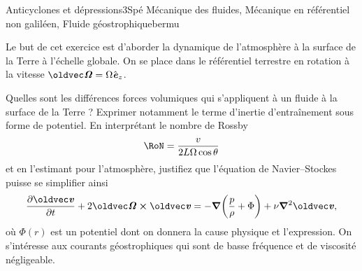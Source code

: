 
\begin{exercise}{Anticyclones et dépressions}{3}{Spé}
{Mécanique des fluides, Mécanique en référentiel non galiléen, Fluide géostrophique}{bermu}

Le but de cet exercice est d'aborder la dynamique de l'atmosphère à la surface de la Terre à l'échelle globale. On se place dans le référentiel terrestre en rotation à la vitesse $\vOm = \Omega\ve_z$.


\begin{questions}
    \questioncours Quelles sont les différences forces volumiques qui s'appliquent à un fluide à la surface de la Terre ? Exprimer notamment le terme d'inertie d'entraînement sous forme de potentiel.
    \question\label{que:rossby} En interprétant le nombre de Rossby 
    $$\RoN = \dfrac{v}{2L\Omega\cos\theta}$$
    et en l'estimant pour l'atmosphère, justifiez que l'équation de Navier--Stockes puisse se simplifier ainsi
    $$\pdv{\vv}{t} + 2\vOm\cross\vv = -\grad\qty(\dfrac{p}{\rho} + \Phi) + \nu\grad^2\vv,$$
    où $\Phi(r)$ est un potentiel dont on donnera la cause physique et l'expression.
    \question On s'intéresse aux courants géostrophiques qui sont de basse fréquence et de viscosité négligeable.
\end{questions}
\end{exercise}
